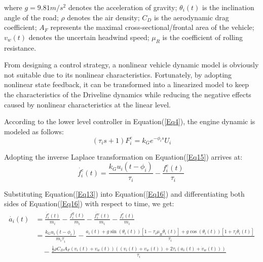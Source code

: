 \documentclass[a4paper]{cas-sc}
\begin{document}
where $g=9.81m/s^2$ denotes the acceleration of gravity; $\theta_i(t)$ is the inclination angle of the road; $\rho$ denotes the air density; $C_D$ is the aerodynamic drag coefficient; $A_F$ represents the maximal cross-sectional/frontal area of the vehicle; $v_w(t)$ denotes the uncertain headwind speed; $\mu_R$ is the coefficient of rolling resistance.

From designing a control strategy, a nonlinear vehicle dynamic model is obviously not suitable due to its nonlinear characteristics. Fortunately, by adopting nonlinear state feedback, it can be transformed into a linearized model to keep the characteristics of the Driveline dynamics while reducing the negative effects caused by nonlinear characteristics at the linear level.

According to the lower level controller in Equation(\ref{Eq4}), the engine dynamic is modeled as follows:
\begin{equation}
  \left(\tau_is+1\right)F_i^e=k_Ge^{-\phi_is}U_i
  \label{Eq15}
\end{equation}


Adopting the inverse Laplace transformation on Equation(\ref{Eq15}) arrives at:
\begin{equation}
  \dot{f_i^e}\left(t\right)=\frac{k_Gu_i(t-\phi_i)}{\tau_i}-\frac{f_i^e\left(t\right)}{\tau_i}\
  \label{Eq16}
\end{equation}

Substituting Equation(\ref{Eq13}) into Equation(\ref{Eq16}) and differentiating both sides of Equation(\ref{Eq16}) with respect to time, we get:
\begin{equation}
  \begin{aligned}
    \dot{a_i}\left(t\right) & =\frac{\dot{f_i^e}\left(t\right)}{m_i}-\frac{\dot{f_i^g}\left(t\right)}{m_i}-\frac{\dot{f_i^w}\left(t\right)}{m_i}-\frac{\dot{f_i^r}\left(t\right)}{m_i}                                                                                                            \\
                            & =\frac{k_Gu_i(t-\phi_i)}{{m_i\tau}_i}-\frac{a_i\left(t\right)+g\sin{\left(\theta_i\left(t\right)\right)}\left[1-\tau_i\mu_R\dot{\theta_i}\left(t\right)\right]+g\cos{\left(\theta_i\left(t\right)\right)}\left[1+\tau_i\dot{\theta_i}\left(t\right)\right]}{\tau_i} \\
                            & \quad -\frac{\frac{1}{2}\rho C_DA_F\left(v_i\left(t\right)+v_w\left(t\right)\right)\left(\left(v_i\left(t\right)+v_w\left(t\right)\right)+2\tau_i(a_i\left(t\right)+\dot{v}_{w}\left(t\right))\right)}{\tau_i}
  \end{aligned}
  \label{Eq17}
\end{equation}
\end{document}
